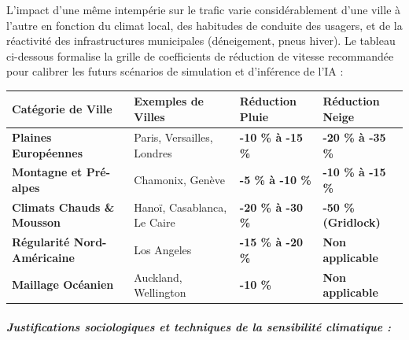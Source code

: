 \documentclass[10pt, a4paper]{article}
\newcounter{none}
\begin{document}
L'impact d'une même intempérie sur le trafic varie considérablement
d'une ville à l'autre en fonction du climat local, des habitudes de
conduite des usagers, et de la réactivité des infrastructures
municipales (déneigement, pneus hiver). Le tableau ci-dessous formalise
la grille de coefficients de réduction de vitesse recommandée pour
calibrer les futurs scénarios de simulation et d'inférence de l'IA :

{\def\LTcaptype{none} %
\begin{longtable}[]{@{}
  >{\raggedright\arraybackslash}p{}
  >{\raggedright\arraybackslash}p{}
  >{\centering\arraybackslash}p{}
  >{\centering\arraybackslash}p{}@{}}
\toprule\noalign{}
\begin{minipage}[b]{\linewidth}\raggedright
Catégorie de Ville
\end{minipage} & \begin{minipage}[b]{\linewidth}\raggedright
Exemples de Villes
\end{minipage} & \begin{minipage}[b]{\linewidth}\centering
Réduction Pluie
\end{minipage} & \begin{minipage}[b]{\linewidth}\centering
Réduction Neige
\end{minipage} \\
\midrule\noalign{}
\endhead
\bottomrule\noalign{}
\endlastfoot
\textbf{Plaines Européennes} & Paris, Versailles, Londres & \textbf{-10
\% à -15 \%} & \textbf{-20 \% à -35 \%} \\
\textbf{Montagne et Pré-alpes} & Chamonix, Genève & \textbf{-5 \% à -10
\%} & \textbf{-10 \% à -15 \%} \\
\textbf{Climats Chauds \& Mousson} & Hanoï, Casablanca, Le Caire &
\textbf{-20 \% à -30 \%} & \textbf{-50 \% (Gridlock)} \\
\textbf{Régularité Nord-Américaine} & Los Angeles & \textbf{-15 \% à -20
\%} & \textbf{Non applicable} \\
\textbf{Maillage Océanien} & Auckland, Wellington & \textbf{-10 \%} &
\textbf{Non applicable} \\
\end{longtable}
}

\subparagraph{Justifications sociologiques et techniques de la
sensibilité climatique
:}\label{justifications-sociologiques-et-techniques-de-la-sensibilituxe9-climatique}
\end{document}
